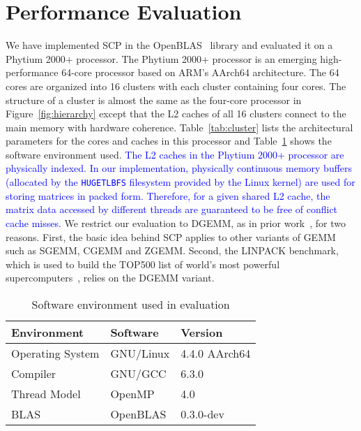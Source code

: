 \section{Performance Evaluation}\label{sec:evaluation}

We have implemented SCP in the OpenBLAS~\cite{openblas} library
and evaluated it on a Phytium 2000+ processor.
The Phytium 2000+ processor is an emerging high-performance
64-core processor based on ARM's AArch64 architecture.
The 64 cores are organized into 16 clusters with each
cluster containing four cores.
The structure of a cluster is almost the same as
the four-core processor in Figure~\ref{fig:hierarchy}
except that the L2 caches of all 16 clusters connect to the main memory
with hardware coherence.
Table~\ref{tab:cluster} lists the
architectural parameters for the cores and caches
in this processor
and Table~\ref{tab:software} shows the software environment used.
\textcolor{blue}{
The L2 caches in the Phytium 2000+ processor are physically indexed.
In our implementation, physically continuous
memory buffers (allocated by the \texttt{HUGETLBFS} filesystem
provided by the Linux kernel) are used for storing
matrices in packed form. Therefore,
for a given shared L2 cache,
the matrix data accessed by different threads 
are guaranteed to be free of conflict cache misses.
}
We restrict our evaluation to DGEMM,
as in prior work~\cite{blispar,augem,poetmicro}, for two reasons.
First, the basic idea behind SCP applies to other
variants of GEMM such as SGEMM, CGEMM and ZGEMM.
Second, the LINPACK benchmark, which is used to build the
TOP500 list of world's most powerful supercomputers~\cite{top500},
relies on the DGEMM variant.

\begin{table}
  \centering
  \caption{Software environment used in evaluation}
  \label{tab:software}
  \begin{tabular}{lll}
    \toprule
    Environment & Software & Version \\
    \midrule
    Operating System & GNU/Linux & 4.4.0 AArch64 \\
    Compiler & GNU/GCC & 6.3.0 \\
    Thread Model & OpenMP & 4.0 \\
    BLAS & OpenBLAS & 0.3.0-dev \\
    \bottomrule
  \end{tabular}
\end{table}



